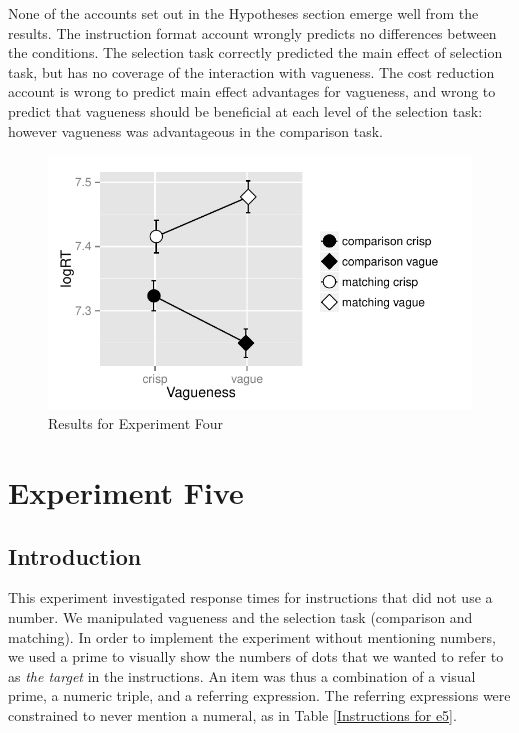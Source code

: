 \documentclass[doc,apacite]{apa6}
\begin{document}
None of the accounts set out in the Hypotheses section emerge well from the results. The instruction format account wrongly predicts no differences between the conditions. The selection task correctly predicted the main effect of selection task, but has no coverage of the interaction with vagueness. The cost reduction account is wrong to predict main effect advantages for vagueness, and wrong to predict that vagueness should be beneficial at each level of the selection task: however vagueness was advantageous in the comparison task.


\begin{figure}[htbp]
\includegraphics[width=.5\textwidth]{images/resultse4.pdf}
\caption{Results for Experiment Four}
\label{resultse4}
\end{figure}

\section{Experiment Five}
\subsection{Introduction}
This experiment investigated response times for instructions that did not use a number. 
We manipulated vagueness and the selection task (comparison and matching). 
In order to implement the experiment without mentioning numbers,  we used a prime to visually show the numbers of dots that we wanted to refer to as {\em the target} in the instructions. 
An item was thus a combination of a visual prime, a numeric triple, and a referring expression.
The referring expressions were constrained to never mention a numeral, as in Table \ref{Instructions for e5}. 
\end{document}
